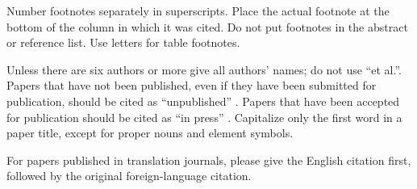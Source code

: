 \documentclass[conference]{IEEEtran}
\begin{document}
Number footnotes separately in superscripts. Place the actual footnote at 
the bottom of the column in which it was cited. Do not put footnotes in the 
abstract or reference list. Use letters for table footnotes.

Unless there are six authors or more give all authors' names; do not use 
``et al.''. Papers that have not been published, even if they have been 
submitted for publication, should be cited as ``unpublished''  . Papers 
that have been accepted for publication should be cited as ``in press''  . 
Capitalize only the first word in a paper title, except for proper nouns and 
element symbols.

For papers published in translation journals, please give the English 
citation first, followed by the original foreign-language citation.




\end{document}
